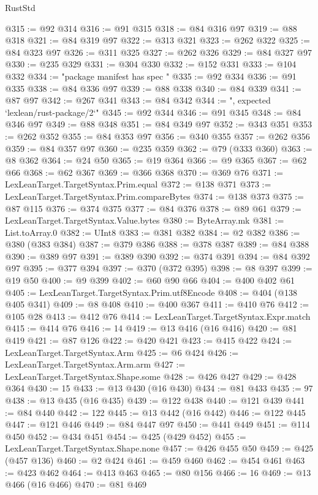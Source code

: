 \begin{lexlean}{RustStd}
\begin{coremodule}
@315 := @92 @314
@316 := @91 @315
@318 := @84 @316 @97
@319 := @88 @318
@321 := @84 @319 @97
@322 := @313 @321
@323 := @262 @322
@325 := @84 @323 @97
@326 := @311 @325
@327 := @262 @326
@329 := @84 @327 @97
@330 := @235 @329
@331 := @304 @330
@332 := @152 @331
@333 := @104 @332
@334 := "package manifest has spec "
@335 := @92 @334
@336 := @91 @335
@338 := @84 @336 @97
@339 := @88 @338
@340 := @84 @339
@341 := @87 @97
@342 := @267 @341
@343 := @84 @342
@344 := ", expected `lexlean/rust-package/2`"
@345 := @92 @344
@346 := @91 @345
@348 := @84 @346 @97
@349 := @88 @348
@351 := @84 @349 @97
@352 := @343 @351
@353 := @262 @352
@355 := @84 @353 @97
@356 := @340 @355
@357 := @262 @356
@359 := @84 @357 @97
@360 := @235 @359
@362 := @79 (@333 @360)
@363 := @8 @362
@364 := @24 @50
@365 := @19 @364
@366 := @9 @365
@367 := @62 @66
@368 := @62 @367
@369 := @366 @368
@370 := @369 @76
@371 := LexLeanTarget.TargetSyntax.Prim.equal
@372 := @138 @371
@373 := LexLeanTarget.TargetSyntax.Prim.compareBytes
@374 := @138 @373
@375 := @87 @115
@376 := @374 @375
@377 := @84 @376
@378 := @89 @61
@379 := LexLeanTarget.TargetSyntax.Value.bytes
@380 := ByteArray.mk
@381 := List.toArray.{0}
@382 := UInt8
@383 := @381 @382
@384 := @2 @382
@386 := @380 (@383 @384)
@387 := @379 @386
@388 := @378 @387
@389 := @84 @388
@390 := @389 @97
@391 := @389 @390
@392 := @374 @391
@394 := @84 @392 @97
@395 := @377 @394
@397 := @370 (@372 @395)
@398 := @8 @397
@399 := @19 @50
@400 := @9 @399
@402 := @60 @90 @66
@404 := @400 @402 @61
@405 := LexLeanTarget.TargetSyntax.Prim.utf8Encode
@408 := @404 (@138 @405 @341)
@409 := @8 @408
@410 := @400 @367
@411 := @410 @76
@412 := @105 @28
@413 := @412 @76
@414 := LexLeanTarget.TargetSyntax.Expr.match
@415 := @414 @76
@416 := 14
@419 := @13 @416 (@16 @416)
@420 := @81 @419
@421 := @87 @126
@422 := @420 @421
@423 := @415 @422
@424 := LexLeanTarget.TargetSyntax.Arm
@425 := @6 @424
@426 := LexLeanTarget.TargetSyntax.Arm.arm
@427 := LexLeanTarget.TargetSyntax.Shape.some
@428 := @426 @427
@429 := @428 @364
@430 := 15
@433 := @13 @430 (@16 @430)
@434 := @81 @433
@435 := 97
@438 := @13 @435 (@16 @435)
@439 := @122 @438
@440 := @121 @439
@441 := @84 @440
@442 := 122
@445 := @13 @442 (@16 @442)
@446 := @122 @445
@447 := @121 @446
@449 := @84 @447 @97
@450 := @441 @449
@451 := @114 @450
@452 := @434 @451
@454 := @425 (@429 @452)
@455 := LexLeanTarget.TargetSyntax.Shape.none
@457 := @426 @455 @50
@459 := @425 (@457 @136)
@460 := @2 @424
@461 := @459 @460
@462 := @454 @461
@463 := @423 @462
@464 := @413 @463
@465 := @80 @156
@466 := 16
@469 := @13 @466 (@16 @466)
@470 := @81 @469

\end{coremodule}
\end{lexlean}
